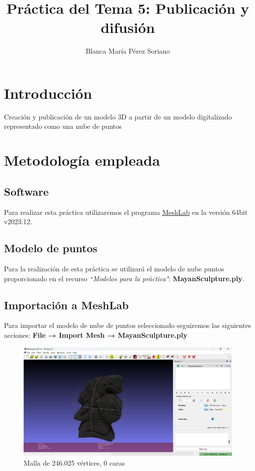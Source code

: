 \documentclass[options]{article}
\title{Práctica del Tema 5: Publicación y difusión}
\author{Blanca María Pérez Soriano}
\begin{document}
\maketitle

\pagebreak

\tableofcontents

\pagebreak

\section{Introducción}
Creación y publicación de un modelo 3D a partir de un modelo digitalizado representado como una nube de puntos


\section{Metodología empleada}
\subsection{Software}
Para realizar esta práctica utilizaremos el programa \href{https://www.meshlab.net/}{MeshLab} en la versión 64bit v2023.12.
\subsection{Modelo de puntos}
Para la realización de esta práctica se utilizará el modelo de nube puntos proporcionado en el recurso \textit{``Modelos para la práctica"}: \textbf{MayanSculpture.ply}.
\subsection{Importación a MeshLab}

Para importar el modelo de nube de puntos seleccionado seguiremos las siguientes acciones: \textbf{File → Import Mesh → MayanSculpture.ply}
\begin{figure}[H]
    \centering
    \includegraphics[scale=0.34]{images/presentacion_importacion.png}
    \caption{Malla de 246.025 vértices, 0 caras}
\end{figure}
\end{document}
